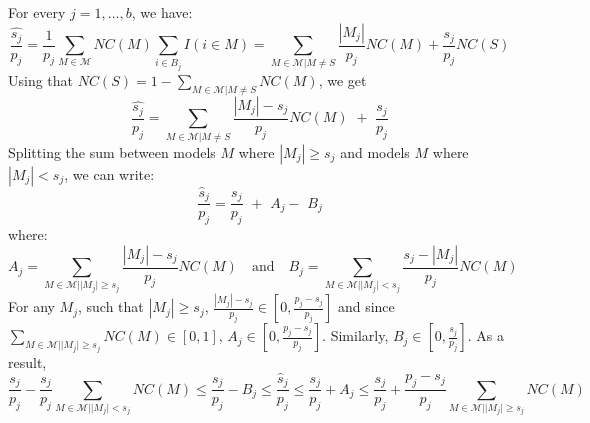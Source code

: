 \documentclass[aos]{imsart}
\theoremstyle{plain}
\begin{document}
\begin{supplement}
For every $j=1,\ldots,b$, we have:
\begin{equation*}
    \frac{\widehat{s_j}}{p_j}
   = \frac{1}{p_j}\sum_{M \in \mathcal{M}}NC(M)\sum_{i \in B_j}I(i\in M) =\sum_{M \in \mathcal{M} | M \neq S}\frac{|M_j|}{p_j}NC(M) +\frac{s_j}{p_j}NC(S) 
\end{equation*}
Using that $NC(S)=1-\sum_{M \in \mathcal{M} | M \neq S}NC(M)$, we get
\begin{equation*}
   \frac{\widehat{s_j}}{p_j}
   =\sum_{M \in \mathcal{M} | M \neq S}\frac{|M_j|-s_j}{p_j}NC(M) \,\,+\,\, \frac{s_j}{p_j}
\end{equation*}
Splitting the sum between models $M$ where $|M_j|\geq s_j$ and models $M$ where $|M_j|<s_j$, we can write:
\begin{equation}\label{eq:rewriteshat}
  \frac{\widehat{s}_j}{p_j}  = \frac{s_j}{p_j}\,\,+\,\, A_j-\,\,B_j  
\end{equation}
where:
$$
    A_j = \sum_{M \in \mathcal{M} | |M_j| \geq s_j}\frac{|M_j|-s_j}{p_j}NC(M)\quad\text{and}\quad
    B_j = \sum_{M \in \mathcal{M} | |M_j| < s_j}\frac{s_j-|M_j|}{p_j}NC(M)
$$
For any $M_j$, such that $|M_j|\geq s_j$, $\frac{|M_j|-s_j}{p_j}\in [0,\frac{p_j-s_j}{p_j}]$ and since $\sum_{M \in \mathcal{M} | |M_j| \geq s_j}NC(M)\in [0,1]$, $A_j\in [0,\frac{p_j-s_j}{p_j}]$. Similarly, $B_j\in [0,\frac{s_j}{p_j}]$. As a result,
\begin{equation*}
 \frac{s_j}{p_j}-\frac{s_j}{p_j}\sum_{M \in \mathcal{M} | |M_j| < s_j}NC(M) \leq \frac{s_j}{p_j}-B_j \leq \frac{\widehat{s}_j}{p_j}  \leq \frac{s_j}{p_j}+ A_j \leq \frac{s_j}{p_j}+ \frac{p_j-s_j}{p_j}\sum_{M \in \mathcal{M} | |M_j| \geq s_j}NC(M)
\end{equation*}


\end{supplement}
\end{document}
